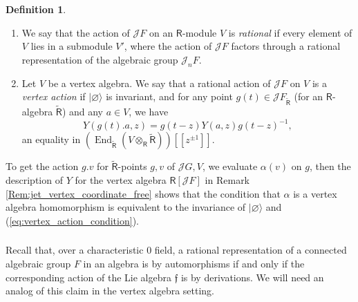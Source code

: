 \documentclass{amsart}
\theoremstyle{definition}
\newtheorem{defi}[Thm]{Definition}
\newcommand{\sss}{\subsubsection{}}
\newcommand{\Ring}{\mathsf{R}}
\newcommand{\Jet}{\mathscr{J}}
\numberwithin{equation}{section}
\begin{document}
\begin{defi}\label{defi:vertex_action_equiv}
\begin{enumerate}
\item 
We say that the action of $\Jet F$ on an $\Ring$-module $V$ is {\it rational} if every element of $V$ lies in a submodule $V'$, where the action of $\Jet F$ factors through a rational representation of the algebraic group $\Jet_n F$. 
\item Let $V$ be a vertex algebra. We say that a rational action of $\Jet F$ on $V$ is a {\it vertex action} if $|\varnothing\rangle$ is invariant, and for any point $g(t)\in \Jet F_{\tilde{\Ring}}$ (for an $\Ring$-algebra $\tilde{\Ring}$) and any $a\in V$, we have 
\begin{equation}\label{eq:vertex_action_condition}
Y(g(t).a,z)=g(t-z)Y(a,z)g(t-z)^{-1},
\end{equation} an equality in $\left(\operatorname{End}_{\tilde{\Ring}} (V\otimes_\Ring \tilde{\Ring})\right)[[z^{\pm 1}]]$. 
\end{enumerate}
\end{defi}

To get the action $g.v$ for $\tilde{\Ring}$-points $g,v$ of $\Jet G, V$, we evaluate $\alpha(v)$ on $g$, then the description of $Y$ for the vertex algebra $\Ring[\Jet F]$ in Remark \ref{Rem:jet_vertex_coordinate_free} shows that the condition that $\alpha$ is a vertex algebra homomorphism is equivalent to the invariance of $|\varnothing\rangle$ and (\ref{eq:vertex_action_condition}).

\sss
Recall that, over a characteristic $0$ field, a rational representation of a connected algebraic group $F$ in an algebra is by automorphisms if and only if the corresponding action of the Lie algebra $\mathfrak{f}$ is by derivations. We will need an analog of this claim in the vertex algebra setting. 
\end{document}
